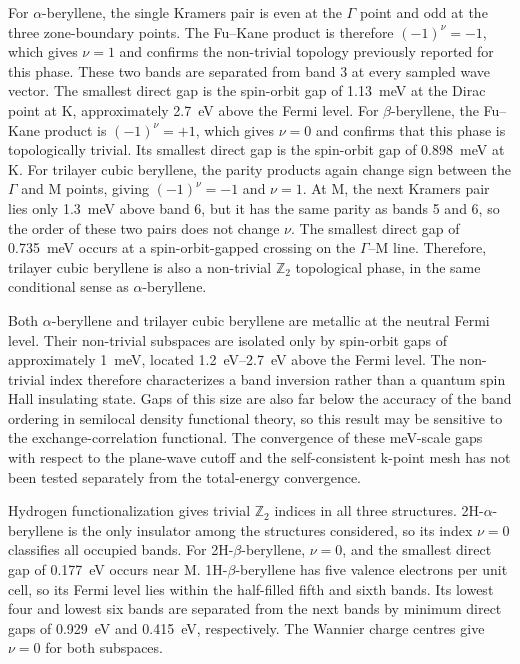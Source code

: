 For $\alpha$-beryllene,
the single Kramers pair is even at the $\Gamma$ point and odd at the three zone-boundary points.
The Fu--Kane product is therefore $(-1)^{\nu}=-1$,
which gives $\nu=1$ and confirms the non-trivial topology previously reported for this phase.
These two bands are separated from band 3 at every sampled wave vector.
The smallest direct gap is the spin-orbit gap of \qty{1.13}{\milli\electronvolt} at the Dirac point at $\mathrm{K}$,
approximately \qty{2.7}{\electronvolt} above the Fermi level.
For $\beta$-beryllene,
the Fu--Kane product is $(-1)^{\nu}=+1$,
which gives $\nu=0$ and confirms that this phase is topologically trivial.
Its smallest direct gap is the spin-orbit gap of \qty{0.898}{\milli\electronvolt} at $\mathrm{K}$.
For trilayer cubic beryllene,
the parity products again change sign between the $\Gamma$ and $\mathrm{M}$ points,
giving $(-1)^{\nu}=-1$ and $\nu=1$.
At $\mathrm{M}$,
the next Kramers pair lies only \qty{1.3}{\milli\electronvolt} above band 6,
but it has the same parity as bands 5 and 6,
so the order of these two pairs does not change $\nu$.
The smallest direct gap of \qty{0.735}{\milli\electronvolt} occurs at a spin-orbit-gapped crossing on the $\Gamma$--$\mathrm{M}$ line.
Therefore,
trilayer cubic beryllene is also a non-trivial $\mathbb{Z}_2$ topological phase,
in the same conditional sense as $\alpha$-beryllene.

Both $\alpha$-beryllene and trilayer cubic beryllene are metallic at the neutral Fermi level.
Their non-trivial subspaces are isolated only by spin-orbit gaps of approximately \qty{1}{\milli\electronvolt},
located \qtyrange{1.2}{2.7}{\electronvolt} above the Fermi level.
The non-trivial index therefore characterizes a band inversion rather than a quantum spin Hall insulating state.
Gaps of this size are also far below the accuracy of the band ordering in semilocal density functional theory,
so this result may be sensitive to the exchange-correlation functional.
The convergence of these meV-scale gaps with respect to the plane-wave cutoff and the self-consistent k-point mesh has not been tested separately from the total-energy convergence.

Hydrogen functionalization gives trivial $\mathbb{Z}_2$ indices in all three structures.
2H-$\alpha$-beryllene is the only insulator among the structures considered,
so its index $\nu=0$ classifies all occupied bands.
For 2H-$\beta$-beryllene,
$\nu=0$,
and the smallest direct gap of \qty{0.177}{\electronvolt} occurs near $\mathrm{M}$.
1H-$\beta$-beryllene has five valence electrons per unit cell,
so its Fermi level lies within the half-filled fifth and sixth bands.
Its lowest four and lowest six bands are separated from the next bands by minimum direct gaps of \qty{0.929}{\electronvolt} and \qty{0.415}{\electronvolt},
respectively.
The Wannier charge centres give $\nu=0$ for both subspaces.

